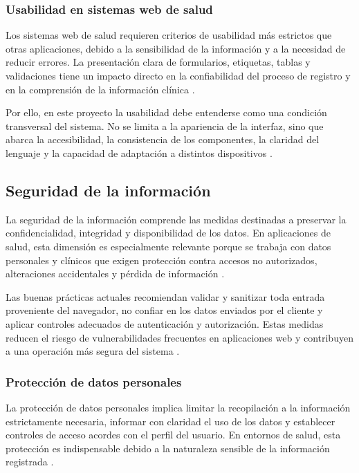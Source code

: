 \subsubsection{Usabilidad en sistemas web de salud}

Los sistemas web de salud requieren criterios de usabilidad más estrictos que otras aplicaciones, debido a la sensibilidad de la información y a la necesidad de reducir errores. La presentación clara de formularios, etiquetas, tablas y validaciones tiene un impacto directo en la confiabilidad del proceso de registro y en la comprensión de la información clínica \cite{mdn2025accessibility,mdn2025security}.

Por ello, en este proyecto la usabilidad debe entenderse como una condición transversal del sistema. No se limita a la apariencia de la interfaz, sino que abarca la accesibilidad, la consistencia de los componentes, la claridad del lenguaje y la capacidad de adaptación a distintos dispositivos \cite{nextjs2025docs,react2025docs,mdn2025accessibility}.

\subsection{Seguridad de la información}

La seguridad de la información comprende las medidas destinadas a preservar la confidencialidad, integridad y disponibilidad de los datos. En aplicaciones de salud, esta dimensión es especialmente relevante porque se trabaja con datos personales y clínicos que exigen protección contra accesos no autorizados, alteraciones accidentales y pérdida de información \cite{owasp2025top10,mdn2025security,mdn2025privacy}.

Las buenas prácticas actuales recomiendan validar y sanitizar toda entrada proveniente del navegador, no confiar en los datos enviados por el cliente y aplicar controles adecuados de autenticación y autorización. Estas medidas reducen el riesgo de vulnerabilidades frecuentes en aplicaciones web y contribuyen a una operación más segura del sistema \cite{mdn2025security,owasp2025top10}.

\subsubsection{Protección de datos personales}

La protección de datos personales implica limitar la recopilación a la información estrictamente necesaria, informar con claridad el uso de los datos y establecer controles de acceso acordes con el perfil del usuario. En entornos de salud, esta protección es indispensable debido a la naturaleza sensible de la información registrada \cite{mdn2025privacy,who2025digitalhealth}.

